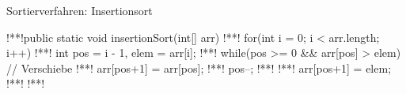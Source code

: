 \begin{frame}[fragile,c]{Sortierverfahren: Insertionsort}
    \begin{plainjava}
!**!public static void insertionSort(int[] arr) {
!**!    for(int i = 0; i < arr.length; i++) {
!**!        int pos = i - 1, elem = arr[i];
!**!        while(pos >= 0 && arr[pos] > elem) { // Verschiebe
!**!            arr[pos+1] = arr[pos];
!**!            pos--;
!**!        }
!**!        arr[pos+1] = elem;
!**!    }
!**!}
    \end{plainjava}
\end{frame}



\def\List#1#2{
    \foreach[count=\i,remember=\i as \li(initially 0)] \n in {#1}{
        \ifnum\i<#2
            \node[inner sep=4pt,ball,outer sep=2pt] (\i) at(1.25*\i,0) {\n};
        \else
            \node[inner sep=4pt,iball,outer sep=2pt] (\i) at(1.25*\i,0) {\n};
        \fi
        \ifnum\i>1
            \draw (\li.east) -- (\i.west);
        \fi
    }
}

